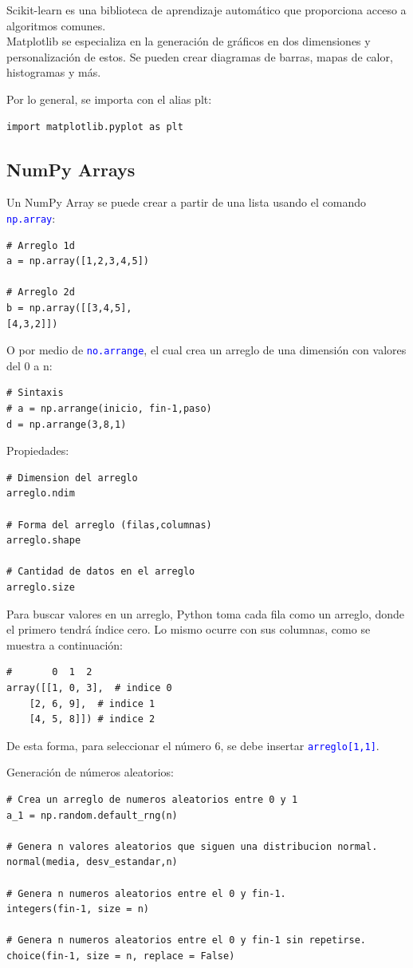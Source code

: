 \documentclass[a4paper, 12pt]{book}
\begin{document}
Scikit-learn es una biblioteca de aprendizaje automático que proporciona acceso a algoritmos comunes.
\\

Matplotlib se especializa en la generación de gráficos en dos dimensiones y personalización de estos. Se pueden crear diagramas de barras, mapas de calor, histogramas y más.

Por lo general, se importa con el alias plt:
\begin{verbatim}
import matplotlib.pyplot as plt
\end{verbatim}

\subsection{NumPy Arrays}
Un NumPy Array se puede crear a partir de una lista usando el comando \texttt{\textcolor{blue}{np.array}}:
\begin{verbatim}
# Arreglo 1d
a = np.array([1,2,3,4,5])
	
# Arreglo 2d
b = np.array([[3,4,5],
[4,3,2]])
\end{verbatim}
O por medio de \texttt{\textcolor{blue}{no.arrange}}, el cual crea un arreglo de una dimensión con valores del 0 a n:
\begin{verbatim}
# Sintaxis
# a = np.arrange(inicio, fin-1,paso)
d = np.arrange(3,8,1)
\end{verbatim}

Propiedades:
\begin{verbatim}
# Dimension del arreglo
arreglo.ndim
	
# Forma del arreglo (filas,columnas)
arreglo.shape
	
# Cantidad de datos en el arreglo
arreglo.size
\end{verbatim}

Para buscar valores en un arreglo, Python toma cada fila como un arreglo, donde el primero tendrá índice cero. Lo mismo ocurre con sus columnas, como se muestra a continuación:
\begin{verbatim}
#       0  1  2
array([[1, 0, 3],  # indice 0
	[2, 6, 9],  # indice 1
	[4, 5, 8]]) # indice 2
\end{verbatim}
De esta forma, para seleccionar el número 6, se debe insertar \texttt{\textcolor{blue}{arreglo[1,1]}}.


Generación de números aleatorios:
\begin{verbatim}
# Crea un arreglo de numeros aleatorios entre 0 y 1
a_1 = np.random.default_rng(n)
	
# Genera n valores aleatorios que siguen una distribucion normal.
normal(media, desv_estandar,n)

# Genera n numeros aleatorios entre el 0 y fin-1.
integers(fin-1, size = n)
	
# Genera n numeros aleatorios entre el 0 y fin-1 sin repetirse.
choice(fin-1, size = n, replace = False)
\end{verbatim}
\end{document}
